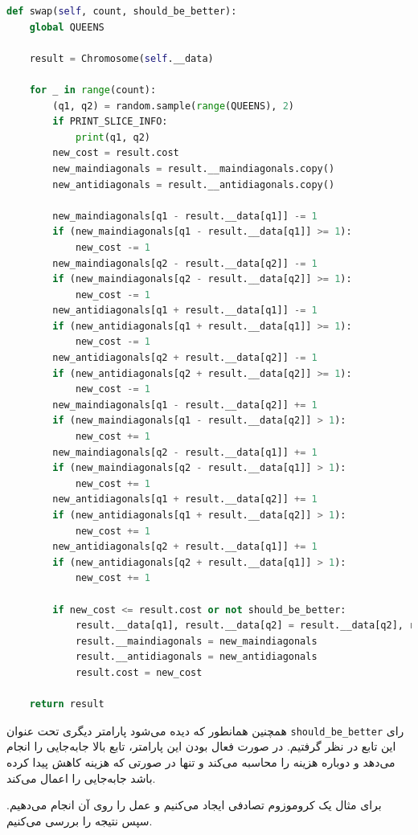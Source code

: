 \documentclass[a4paper, 12pt]{article}
\theoremstyle{definition}
\begin{document}
\LTR
\begin{lstlisting}[language=Python]
def swap(self, count, should_be_better):
    global QUEENS

    result = Chromosome(self.__data)

    for _ in range(count):
        (q1, q2) = random.sample(range(QUEENS), 2)
        if PRINT_SLICE_INFO:
            print(q1, q2)
        new_cost = result.cost
        new_maindiagonals = result.__maindiagonals.copy()
        new_antidiagonals = result.__antidiagonals.copy()

        new_maindiagonals[q1 - result.__data[q1]] -= 1
        if (new_maindiagonals[q1 - result.__data[q1]] >= 1):
            new_cost -= 1
        new_maindiagonals[q2 - result.__data[q2]] -= 1
        if (new_maindiagonals[q2 - result.__data[q2]] >= 1):
            new_cost -= 1
        new_antidiagonals[q1 + result.__data[q1]] -= 1
        if (new_antidiagonals[q1 + result.__data[q1]] >= 1):
            new_cost -= 1
        new_antidiagonals[q2 + result.__data[q2]] -= 1
        if (new_antidiagonals[q2 + result.__data[q2]] >= 1):
            new_cost -= 1
        new_maindiagonals[q1 - result.__data[q2]] += 1
        if (new_maindiagonals[q1 - result.__data[q2]] > 1):
            new_cost += 1
        new_maindiagonals[q2 - result.__data[q1]] += 1
        if (new_maindiagonals[q2 - result.__data[q1]] > 1):
            new_cost += 1
        new_antidiagonals[q1 + result.__data[q2]] += 1
        if (new_antidiagonals[q1 + result.__data[q2]] > 1):
            new_cost += 1
        new_antidiagonals[q2 + result.__data[q1]] += 1
        if (new_antidiagonals[q2 + result.__data[q1]] > 1):
            new_cost += 1

        if new_cost <= result.cost or not should_be_better:
            result.__data[q1], result.__data[q2] = result.__data[q2], result.__data[q1]
            result.__maindiagonals = new_maindiagonals
            result.__antidiagonals = new_antidiagonals
            result.cost = new_cost

    return result
\end{lstlisting}
\RTL

همچنین همانطور که دیده می‌شود پارامتر دیگری تحت عنوان
\texttt{should\_be\_better}
رای این تابع در نظر گرفتیم. در صورت فعال بودن این پارامتر، تابع بالا جابه‌جایی را انجام می‌دهد و دوباره هزینه را محاسبه می‌کند و تنها در صورتی که هزینه کاهش پیدا کرده باشد جابه‌جایی را اعمال می‌کند.

برای مثال یک کروموزوم تصادفی ایجاد می‌کنیم و عمل
را روی آن انجام می‌دهیم. سپس نتیجه را بررسی می‌کنیم.
\end{document}
